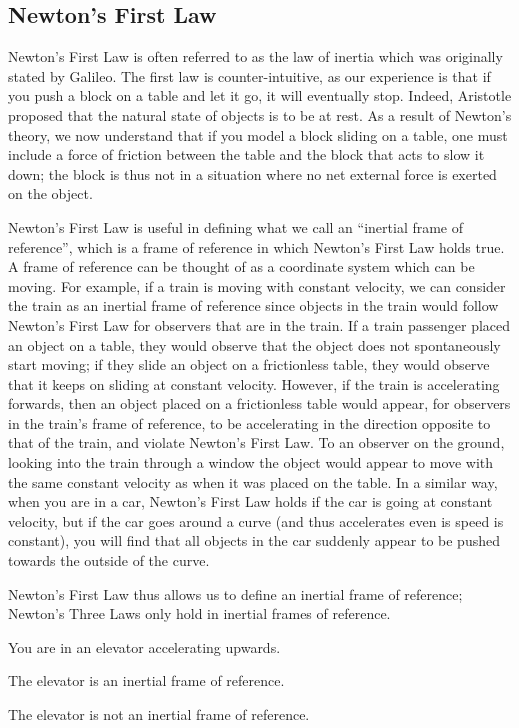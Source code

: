 \subsection{Newton's First Law}
Newton's First Law is often referred to as the law of inertia which was originally stated by Galileo. The first law is counter-intuitive, as our experience is that if you push a block on a table and let it go, it will eventually stop. Indeed, Aristotle proposed that the natural state of objects is to be at rest. As a result of Newton's theory, we now understand that if you model a block sliding on a table, one must include a force of friction between the table and the block that acts to slow it down; the block is thus not in a situation where no net external force is exerted on the object.

Newton's First Law is useful in defining what we call an ``inertial frame of reference'', which is a frame of reference in which Newton's First Law holds true. A frame of reference can be thought of as a coordinate system which can be moving. For example, if a train is moving with constant velocity, we can consider the train as an inertial frame of reference since objects in the train would follow Newton's First Law for observers that are in the train. If a train passenger placed an object on a table, they would observe that the object does not spontaneously start moving; if they slide an object on a frictionless table, they would observe that it keeps on sliding at constant velocity. However, if the train is accelerating forwards, then an object placed on a frictionless table would appear, for observers in the train's frame of reference, to be accelerating in the direction opposite to that of the train, and violate Newton's First Law. To an observer on the ground, looking into the train through a window the object would appear to move with the same constant velocity as when it was placed on the table. In a similar way, when you are in a car, Newton's First Law holds if the car is going at constant velocity, but if the car goes around a curve (and thus accelerates even is speed is constant), you will find that all objects in the car suddenly appear to be pushed towards the outside of the curve.

Newton's First Law thus allows us to define an inertial frame of reference; Newton's Three Laws only hold in inertial frames of reference.

\begin{checkpointMC}{You are in an elevator accelerating upwards.}
\item The elevator is an inertial frame of reference.
\item The elevator is not an inertial frame of reference.%
\end{checkpointMC}


